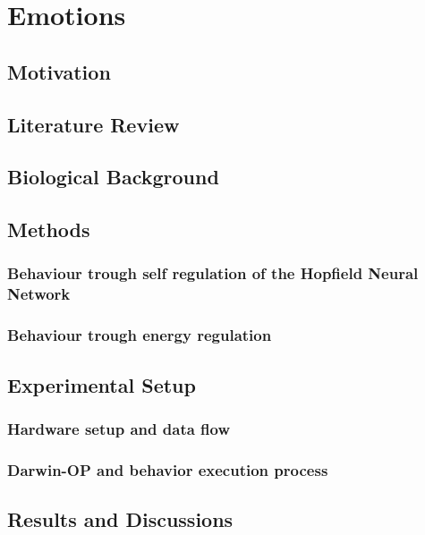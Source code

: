 \documentclass[a4,12pt]{ozu-thesis}
\begin{document}
\chapter{Emotions}
\section{Motivation}


\section{Literature Review}


\section{Biological Background}


\section{Methods}

\subsection{Behaviour trough self regulation of the Hopfield Neural Network}

\subsection{Behaviour trough energy regulation}


\section{Experimental Setup}

\subsection{Hardware setup and data flow}

\subsection{Darwin-OP and behavior execution process}


\section{Results and Discussions}

\end{document}
